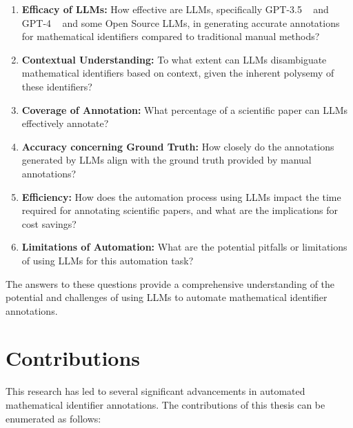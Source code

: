 \begin{enumerate}
    \item \textbf{Efficacy of LLMs:} How effective are LLMs, specifically GPT-3.5 ~\citep{openai2023} and GPT-4 ~\citep{2303.08774} and some Open Source LLMs, in generating accurate annotations for mathematical identifiers compared to traditional manual methods?
    
    \item \textbf{Contextual Understanding:} To what extent can LLMs disambiguate mathematical identifiers based on context, given the inherent polysemy of these identifiers?
    
    \item \textbf{Coverage of Annotation:} What percentage of a scientific paper can LLMs effectively annotate?
    
    \item \textbf{Accuracy concerning Ground Truth:} How closely do the annotations generated by LLMs align with the ground truth provided by manual annotations?
    
    \item \textbf{Efficiency:} How does the automation process using LLMs impact the time required for annotating scientific papers, and what are the implications for cost savings?
    
    \item \textbf{Limitations of Automation:} What are the potential pitfalls or limitations of using LLMs for this automation task?
\end{enumerate}

The answers to these questions provide a comprehensive understanding of the potential and challenges of using LLMs to automate mathematical identifier annotations.

\section{Contributions}

This research has led to several significant advancements in automated mathematical identifier annotations. The contributions of this thesis can be enumerated as follows:

